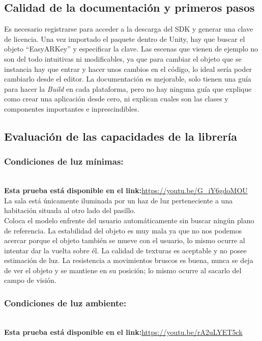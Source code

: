 \subsection{Calidad de la documentación y primeros pasos}
Es necesario registrarse para acceder a la descarga del SDK y generar una clave de licencia. Una vez importado el paquete dentro de Unity, hay que buscar el objeto ``EasyARKey'' y especificar la clave. Las escenas que vienen de ejemplo no son del todo intuitivas ni modificables, ya que para cambiar el objeto que se instancia hay que entrar y hacer unos cambios en el código, lo ideal sería poder cambiarlo desde el editor. La documentación es mejorable, solo tienen una guía para hacer la \textit{Build} en cada plataforma, pero no hay ninguna guía que explique como crear una aplicación desde cero, ni explican cuales son las clases y componentes importantes e inprescindibles.

\subsection{Evaluación de las capacidades de la librería}
\subsubsection{Condiciones de luz mínimas:}\\
\textbf{Esta prueba está disponible en el link:}\url{https://youtu.be/G_iY6gdoMOU}\\

La sala está únicamente iluminada por un haz de luz perteneciente a una habitación situada al otro lado del pasillo.\\

Coloca el modelo enfrente del usuario automáticamente sin buscar ningún plano de referencia. La estabilidad del objeto es muy mala ya que no nos podemos acercar porque el objeto también se mueve con el usuario, lo mismo ocurre al intentar dar la vuelta sobre él. La calidad de texturas es aceptable y no posee estimación de luz. La resistencia a movimientos bruscos es buena, nunca se deja de ver el objeto y se mantiene en su posición; lo mismo ocurre al sacarlo del campo de visión.

\subsubsection{Condiciones de luz ambiente:}\\
\textbf{Esta prueba está disponible en el link:}\url{https://youtu.be/rA2uLYET5ck}\\

